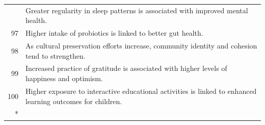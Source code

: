 \documentclass[
  letterpaper,
  DIV=11,
  numbers=noendperiod]{scrartcl}
\begin{document}
\begin{longtable}[t]{r>{\raggedright\arraybackslash}p{35em}}
\addlinespace
96 & Greater regularity in sleep patterns is associated with improved mental health.\\
97 & Higher intake of probiotics is linked to better gut health.\\
98 & As cultural preservation efforts increase, community identity and cohesion tend to strengthen.\\
99 & Increased practice of gratitude is associated with higher levels of happiness and optimism.\\
100 & Higher exposure to interactive educational activities is linked to enhanced learning outcomes for children.\\*

\end{longtable}
\end{document}
